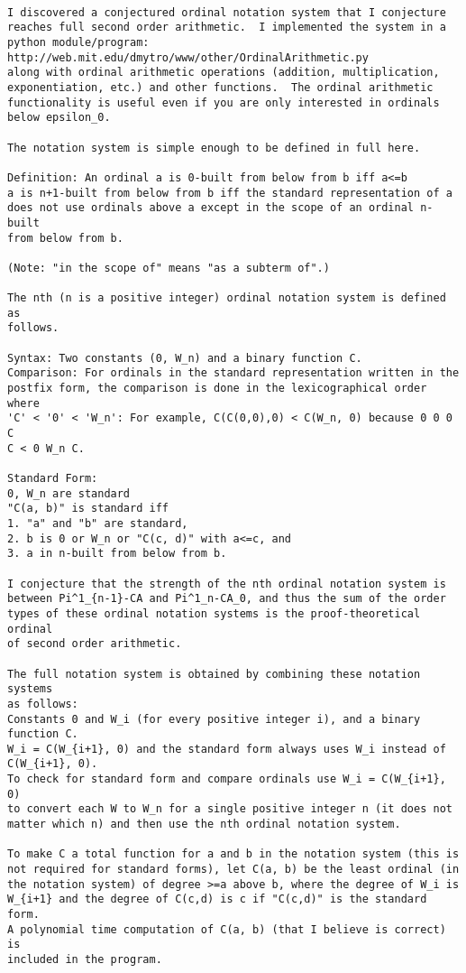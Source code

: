 \documentclass[10pt]{article}
\begin{document}
\begin{verbatim}

I discovered a conjectured ordinal notation system that I conjecture 
reaches full second order arithmetic.  I implemented the system in a 
python module/program:
http://web.mit.edu/dmytro/www/other/OrdinalArithmetic.py
along with ordinal arithmetic operations (addition, multiplication, 
exponentiation, etc.) and other functions.  The ordinal arithmetic 
functionality is useful even if you are only interested in ordinals 
below epsilon_0.

The notation system is simple enough to be defined in full here.

Definition: An ordinal a is 0-built from below from b iff a<=b
a is n+1-built from below from b iff the standard representation of a 
does not use ordinals above a except in the scope of an ordinal n-built 
from below from b.

(Note: "in the scope of" means "as a subterm of".)

The nth (n is a positive integer) ordinal notation system is defined as 
follows.

Syntax: Two constants (0, W_n) and a binary function C.
Comparison: For ordinals in the standard representation written in the 
postfix form, the comparison is done in the lexicographical order where 
'C' < '0' < 'W_n': For example, C(C(0,0),0) < C(W_n, 0) because 0 0 0 C 
C < 0 W_n C.

Standard Form:
0, W_n are standard
"C(a, b)" is standard iff
1. "a" and "b" are standard,
2. b is 0 or W_n or "C(c, d)" with a<=c, and
3. a in n-built from below from b.

I conjecture that the strength of the nth ordinal notation system is 
between Pi^1_{n-1}-CA and Pi^1_n-CA_0, and thus the sum of the order 
types of these ordinal notation systems is the proof-theoretical ordinal 
of second order arithmetic.

The full notation system is obtained by combining these notation systems 
as follows:
Constants 0 and W_i (for every positive integer i), and a binary function C.
W_i = C(W_{i+1}, 0) and the standard form always uses W_i instead of 
C(W_{i+1}, 0).
To check for standard form and compare ordinals use W_i = C(W_{i+1}, 0) 
to convert each W to W_n for a single positive integer n (it does not 
matter which n) and then use the nth ordinal notation system.

To make C a total function for a and b in the notation system (this is 
not required for standard forms), let C(a, b) be the least ordinal (in 
the notation system) of degree >=a above b, where the degree of W_i is 
W_{i+1} and the degree of C(c,d) is c if "C(c,d)" is the standard form.  
A polynomial time computation of C(a, b) (that I believe is correct) is 
included in the program.


\end{verbatim}
\end{document}
